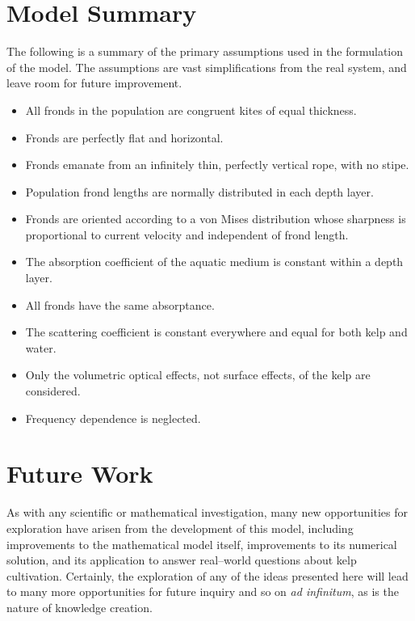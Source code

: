 \section{Model Summary}
The following is a summary of the primary assumptions used in the formulation of the model.
The assumptions are vast simplifications from the real system, and leave room for future improvement.
\begin{itemize}
  \item All fronds in the population are congruent kites of equal thickness.
  \item Fronds are perfectly flat and horizontal.
  \item Fronds emanate from an infinitely thin, perfectly vertical rope, with no stipe.
  \item Population frond lengths are normally distributed in each depth layer.
  \item Fronds are oriented according to a von Mises distribution whose sharpness is proportional to current velocity and independent of frond length.
  \item The absorption coefficient of the aquatic medium is constant within a depth layer.
  \item All fronds have the same absorptance.
  \item The scattering coefficient is constant everywhere and equal for both kelp and water.
  \item Only the volumetric optical effects, not surface effects, of the kelp are considered.
  \item Frequency dependence is neglected.
\end{itemize}


\section{Future Work}
As with any scientific or mathematical investigation, many new opportunities for exploration have arisen from the development of this model, including improvements to the mathematical model itself, improvements to its numerical solution, and its application to answer real--world questions about kelp cultivation.
Certainly, the exploration of any of the ideas presented here will lead to many more opportunities for future inquiry and so on \textit{ad infinitum}, as is the nature of knowledge creation.
